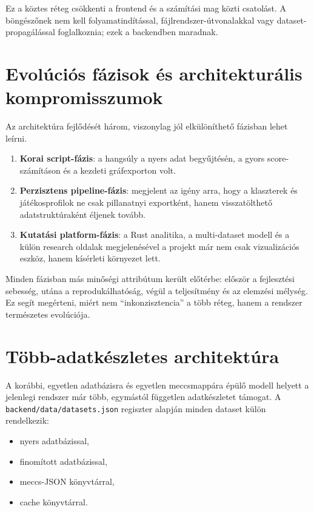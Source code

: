 ﻿\documentclass[a4paper,12pt]{report}
\begin{document}
Ez a köztes réteg csökkenti a frontend és a számítási mag közti csatolást. A böngészőnek nem kell folyamatindítással, fájlrendszer-útvonalakkal vagy dataset-propagálással foglalkoznia; ezek a backendben maradnak.

\section{Evolúciós fázisok és architekturális kompromisszumok}

Az architektúra fejlődését három, viszonylag jól elkülöníthető fázisban lehet leírni.

\begin{enumerate}
    \item \textbf{Korai script-fázis}: a hangsúly a nyers adat begyűjtésén, a gyors score-számításon és a kezdeti gráfexporton volt.
    \item \textbf{Perzisztens pipeline-fázis}: megjelent az igény arra, hogy a klaszterek és játékosprofilok ne csak pillanatnyi exportként, hanem visszatölthető adatstruktúraként éljenek tovább.
    \item \textbf{Kutatási platform-fázis}: a Rust analitika, a multi-dataset modell és a külön research oldalak megjelenésével a projekt már nem csak vizualizációs eszköz, hanem kísérleti környezet lett.
\end{enumerate}

Minden fázisban más minőségi attribútum került előtérbe: először a fejlesztési sebesség, utána a reprodukálhatóság, végül a teljesítmény és az elemzési mélység. Ez segít megérteni, miért nem ``inkonzisztencia'' a több réteg, hanem a rendszer természetes evolúciója.

\section{Több-adatkészletes architektúra}

A korábbi, egyetlen adatbázisra és egyetlen meccsmappára épülő modell helyett a jelenlegi rendszer már több, egymástól független adatkészletet támogat. A \texttt{backend/data/datasets.json} regiszter alapján minden dataset külön rendelkezik:

\begin{itemize}
    \item nyers adatbázissal,
    \item finomított adatbázissal,
    \item meccs-JSON könyvtárral,
    \item cache könyvtárral.
\end{itemize}
\end{document}
